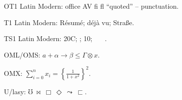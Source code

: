 \documentclass{article}
\begin{document}
{\selectfont
OT1 Latin Modern: office AV fi fl ``quoted'' -- punctuation.}

T1 Latin Modern: R\'esum\'e; d\'ej\`a vu; \guillemotleft Stra\ss e\guillemotright.

TS1 Latin Modern: 20\textdegree C; ; 10\textperthousand;
\textcurrency\ \textbrokenbar\ \textcopyright\ \textregistered.

OML/OMS: $a + \alpha \rightarrow \beta \leq \Gamma \otimes x$.

OMX: $\displaystyle \sum_{i=0}^{n} x_i =
\left\{\frac{1}{1+x^2}\right\}^{\!2}$.

U/lasy: $\mho\ \Join\ \Box\ \Diamond\ \leadsto\ \sqsubset$.
\end{document}
